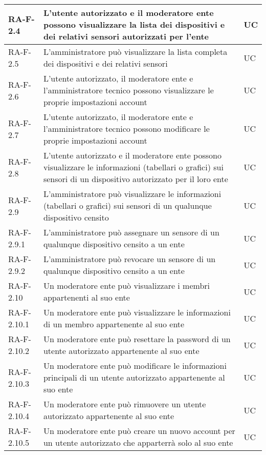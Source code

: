 \begin{center}
\begin{longtable}{|p{3cm}|p{10cm}|p{2cm}|}
		{\color{gray} RA-F-}2.4 & L'utente autorizzato e il moderatore ente possono visualizzare la lista dei dispositivi e dei relativi sensori autorizzati per l'ente & UC \\ \hline
		{\color{gray} RA-F-}2.5 & L'amministratore può visualizzare la lista completa dei dispositivi e dei relativi sensori & UC \\ \hline

		{\color{gray} RA-F-}2.6 & L'utente autorizzato, il moderatore ente e l'amministratore tecnico possono visualizzare le proprie impostazioni account & UC \\ \hline
		{\color{gray} RA-F-}2.7 & L'utente autorizzato, il moderatore ente e l'amministratore tecnico possono modificare le proprie impostazioni account & UC \\ \hline
		
		{\color{gray} RA-F-}2.8 & L'utente autorizzato e il moderatore ente possono visualizzare le informazioni (tabellari o grafici) sui sensori di un dispositivo autorizzato per il loro ente & UC \\ \hline
		{\color{gray} RA-F-}2.9 & L'amministratore può visualizzare le informazioni (tabellari o grafici) sui sensori di un qualunque dispositivo censito & UC \\ \hline
		{\color{gray} RA-F-}2.9.1 & L'amministratore può assegnare un sensore di un qualunque dispositivo censito a un ente & UC \\ \hline
		{\color{gray} RA-F-}2.9.2 & L'amministratore può revocare un sensore di un qualunque dispositivo censito a un ente & UC \\ \hline

		{\color{gray} RA-F-}2.10 & Un moderatore ente può visualizzare i membri appartenenti al suo ente & UC \\ \hline
		{\color{gray} RA-F-}2.10.1 & Un moderatore ente può visualizzare le informazioni di un membro appartenente al suo ente & UC \\ \hline
		{\color{gray} RA-F-}2.10.2 & Un moderatore ente può resettare la password di un utente autorizzato appartenente al suo ente & UC \\ \hline
		{\color{gray} RA-F-}2.10.3 & Un moderatore ente può modificare le informazioni principali di un utente autorizzato appartenente al suo ente & UC \\ \hline
		{\color{gray} RA-F-}2.10.4 & Un moderatore ente può rimuovere un utente autorizzato appartenente al suo ente & UC \\ \hline
		{\color{gray} RA-F-}2.10.5 & Un moderatore ente può creare un nuovo account per un utente autorizzato che apparterrà solo al suo ente & UC \\ \hline


\end{longtable}
\end{center}
